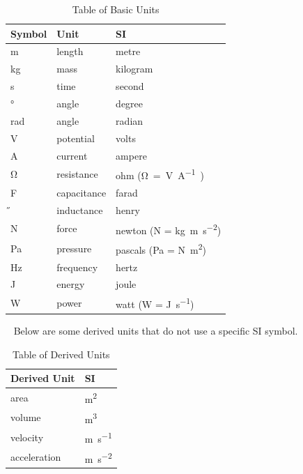 \documentclass[12pt, titlepage]{article}
\begin{document}
\renewcommand{\arraystretch}{1.2}
	\begin{table}[H]
	  \noindent\begin{tabular}{l l l} 
	    \toprule		
	    \textbf{Symbol} & \textbf{Unit} & \textbf{SI}\\
	    \midrule 
	    \si{\metre} & length & metre\\
	    \si{\kilogram} & mass	& kilogram\\
	    \si{\second} & time & second\\
	    \si{\degree} & angle & degree\\
	    \si{\radian} & angle & radian\\
	    \si{\V} & potential & volts\\
	    \si{\ampere} & current & ampere\\
	    \si{\ohm} & resistance & ohm (\si\ohm = \si{\V\per\ampere})\\
	    \si{\F} & capacitance & farad\\
	    \si{\H} & inductance & henry\\
	    N & force & newton (N = \si{\kilogram\metre\per\square\second})\\
	    Pa & pressure & pascals (Pa = N\si{\per\square\metre})\\
	    \si{\Hz} & frequency & hertz\\
	    \si{\joule} & energy & joule\\
	    \si{\watt} & power & watt (W = \si{\joule\per\second})\\
	    \bottomrule
	  \end{tabular}
	\caption{\label{tabUnit}Table of Basic Units}
	\end{table}  
  ~\newline
Below are some derived units that do not use a specific SI symbol.
~\newline


  \renewcommand{\arraystretch}{1.2}
\begin{table}[H]
	 \noindent \begin{tabular}{l l} 
	    \toprule		
	    \textbf{Derived Unit} & \textbf{SI}\\
	    \midrule 
	    area  & \si{\square\metre}\\
	    volume & \si{\cubic\metre}\\
	    velocity &  \si{\metre\per\second}\\
	    acceleration &  \si{\metre\per\square\second}\\    
	    \bottomrule
	  \end{tabular}
	\caption{\label{devUnit}Table of Derived Units}  
\end{table}
\end{document}
